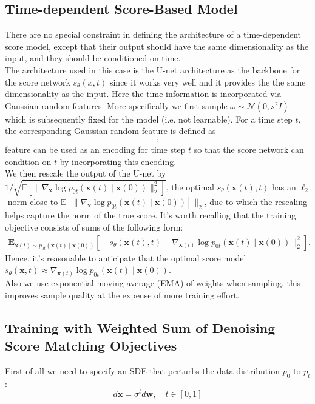 \documentclass{article}
\begin{document}
\subsection{Time-dependent Score-Based Model}
There are no special constraint in defining the architecture of a time-dependent score model, except that their output should have the same dimensionality as the input, and they should be conditioned on time. \\
The architecture used in this case is the U-net architecture as the backbone for the score network $s_{\theta}(x,t)$ since it works very well and it provides the the same dimensionality as the input. Here the time information is incorporated via Gaussian random features. More specifically we first sample $\omega \sim \mathcal{N}(0,s^2I)$ which is subsequently fixed for the model (i.e. not learnable). For a time step $t$, the corresponding Gaussian random feature is defined as
\begin{align}
  [\sin(2\pi \omega t) ; \cos(2\pi \omega t)],
\end{align}
feature can be used as an encoding for time step $t$ so that the score network can condition on $t$ by incorporating this encoding.\\
We then rescale the output of the U-net by $1/\sqrt{\mathbb{E}[\|\nabla_{\mathbf{x}}\log p_{0t}(\mathbf{x}(t) \mid \mathbf{x}(0)) \|_2^2]}$, the optimal $s_\theta(\mathbf{x}(t), t)$ has an $\ell_2$-norm close to $\mathbb{E}[\|\nabla_{\mathbf{x}}\log p_{0t}(\mathbf{x}(t) \mid \mathbf{x}(0))]\|_2$, due to which the rescaling helps capture the norm of the true score. It's worth recalling that the training objective consists of sums of the following form:
\begin{align*}
\mathbf{E}_{\mathbf{x}(t) \sim p_{0t}(\mathbf{x}(t) \mid \mathbf{x}(0))}[ \|s_\theta(\mathbf{x}(t), t) - \nabla_{\mathbf{x}(t)}\log p_{0t}(\mathbf{x}(t) \mid \mathbf{x}(0))\|_2^2].
\end{align*}
Hence, it's reasonable to anticipate that the optimal score model $s_\theta(\mathbf{x}, t) \approx \nabla_{\mathbf{x}(t)} \log p_{0t}(\mathbf{x}(t) \mid \mathbf{x}(0))$.\\ 
Also we use exponential moving average (EMA) of weights when sampling, this improves sample quality at the expense of more training effort.
	\subsection{Training with Weighted Sum of Denoising Score Matching Objectives}
First of all we need to specify an SDE that perturbs the data distribution $p_0$ to $p_{t}$:
	\begin{equation}
		d \mathbf{x} = \sigma^t d\mathbf{w}, \quad t\in[0,1]
	\end{equation}
		
\end{document}
